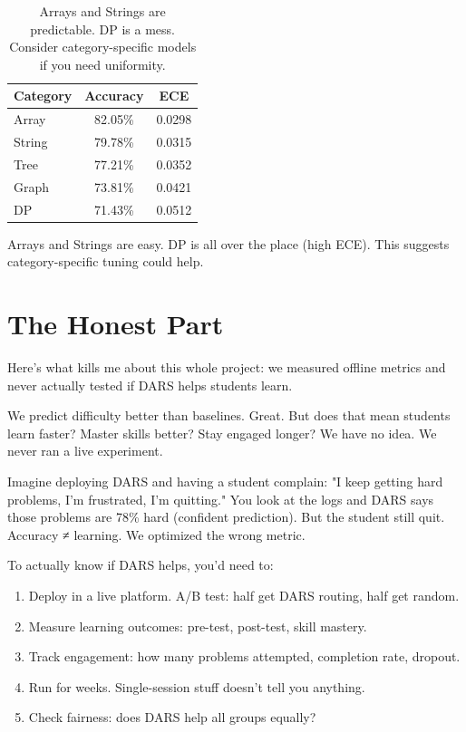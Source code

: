 \documentclass[conference]{IEEEtran}
\begin{document}
\begin{table}[h]
\centering
\small
\begin{tabular}{l|c|c}
\toprule
\textbf{Category} & \textbf{Accuracy} & \textbf{ECE} \\
\midrule
Array & 82.05\% & 0.0298 \\
String & 79.78\% & 0.0315 \\
Tree & 77.21\% & 0.0352 \\
Graph & 73.81\% & 0.0421 \\
DP & 71.43\% & 0.0512 \\
\bottomrule
\end{tabular}
\caption{Arrays and Strings are predictable. DP is a mess. Consider category-specific models if you need uniformity.}
\end{table}

Arrays and Strings are easy. DP is all over the place (high ECE). This suggests category-specific tuning could help.

\section{The Honest Part}

Here's what kills me about this whole project: we measured offline metrics and never actually tested if DARS helps students learn.

We predict difficulty better than baselines. Great. But does that mean students learn faster? Master skills better? Stay engaged longer? We have no idea. We never ran a live experiment.

Imagine deploying DARS and having a student complain: "I keep getting hard problems, I'm frustrated, I'm quitting." You look at the logs and DARS says those problems are 78\% hard (confident prediction). But the student still quit. Accuracy ≠ learning. We optimized the wrong metric.

To actually know if DARS helps, you'd need to:
\begin{enumerate}
    \item Deploy in a live platform. A/B test: half get DARS routing, half get random.
    \item Measure learning outcomes: pre-test, post-test, skill mastery.
    \item Track engagement: how many problems attempted, completion rate, dropout.
    \item Run for weeks. Single-session stuff doesn't tell you anything.
    \item Check fairness: does DARS help all groups equally?
\end{enumerate}
\end{document}
